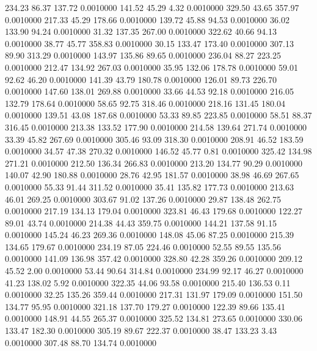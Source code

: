  234.23   86.37  137.72   0.0010000
 141.52   45.29    4.32   0.0010000
 329.50   43.65  357.97   0.0010000
 217.33   45.29  178.66   0.0010000
 139.72   45.88   94.53   0.0010000
  36.02  133.90   94.24   0.0010000
  31.32  137.35  267.00   0.0010000
 322.62   40.66   94.13   0.0010000
  38.77   45.77  358.83   0.0010000
  30.15  133.47  173.40   0.0010000
 307.13   89.90  313.29   0.0010000
 143.97  135.86   89.65   0.0010000
 236.04   88.27  223.25   0.0010000
 212.47  134.92  267.03   0.0010000
  35.95  132.06  178.78   0.0010000
  59.01   92.62   46.20   0.0010000
 141.39   43.79  180.78   0.0010000
 126.01   89.73  226.70   0.0010000
 147.60  138.01  269.88   0.0010000
  33.66   44.53   92.18   0.0010000
 216.05  132.79  178.64   0.0010000
  58.65   92.75  318.46   0.0010000
 218.16  131.45  180.04   0.0010000
 139.51   43.08  187.68   0.0010000
  53.33   89.85  223.85   0.0010000
  58.51   88.37  316.45   0.0010000
 213.38  133.52  177.90   0.0010000
 214.58  139.64  271.74   0.0010000
  33.39   45.82  267.69   0.0010000
 305.46   93.09  318.30   0.0010000
 208.91   46.52  183.59   0.0010000
  34.57   47.38  270.32   0.0010000
 146.52   45.77    0.81   0.0010000
 325.42  134.98  271.21   0.0010000
 212.50  136.34  266.83   0.0010000
 213.20  134.77   90.29   0.0010000
 140.07   42.90  180.88   0.0010000
  28.76   42.95  181.57   0.0010000
  38.98   46.69  267.65   0.0010000
  55.33   91.44  311.52   0.0010000
  35.41  135.82  177.73   0.0010000
 213.63   46.01  269.25   0.0010000
 303.67   91.02  137.26   0.0010000
  29.87  138.48  262.75   0.0010000
 217.19  134.13  179.04   0.0010000
 323.81   46.43  179.68   0.0010000
 122.27   89.01   43.74   0.0010000
 214.38   44.43  359.75   0.0010000
 144.21  137.58   91.15   0.0010000
 145.24   46.23  269.36   0.0010000
 148.08   45.06   87.25   0.0010000
 215.39  134.65  179.67   0.0010000
 234.19   87.05  224.46   0.0010000
  52.55   89.55  135.56   0.0010000
 141.09  136.98  357.42   0.0010000
 328.80   42.28  359.26   0.0010000
 209.12   45.52    2.00   0.0010000
  53.44   90.64  314.84   0.0010000
 234.99   92.17   46.27   0.0010000
  41.23  138.02    5.92   0.0010000
 322.35   44.06   93.58   0.0010000
 215.40  136.53    0.11   0.0010000
  32.25  135.26  359.44   0.0010000
 217.31  131.97  179.09   0.0010000
 151.50  134.77   95.95   0.0010000
 321.18  137.70  179.27   0.0010000
 122.39   89.66  135.41   0.0010000
 148.91   44.55  265.37   0.0010000
 325.52  134.81  273.65   0.0010000
 330.06  133.47  182.30   0.0010000
 305.19   89.67  222.37   0.0010000
  38.47  133.23    3.43   0.0010000
 307.48   88.70  134.74   0.0010000
